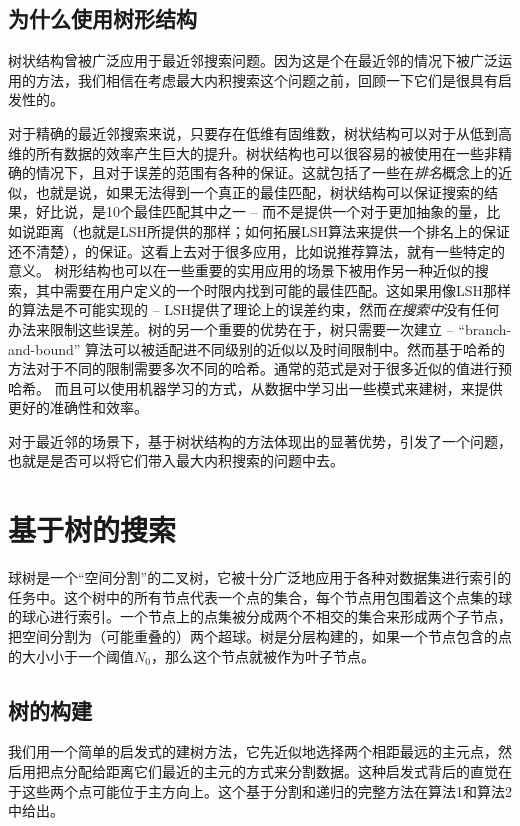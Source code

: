 \documentclass[twocolumn]{article}
\begin{document}
\subsection{为什么使用树形结构}

树状结构曾被广泛应用于最近邻搜索问题。因为这是个在最近邻的情况下被广泛运用的方法，我们相信在考虑最大内积搜索这个问题之前，回顾一下它们是很具有启发性的。

对于精确的最近邻搜索来说，只要存在低维有固维数，树状结构可以对于从低到高维的所有数据的效率产生巨大的提升。树状结构也可以很容易的被使用在一些非精确的情况下，且对于误差的范围有各种的保证。这就包括了一些在\emph{排名}概念上的近似，也就是说，如果无法得到一个真正的最佳匹配，树状结构可以保证搜索的结果，好比说，是10个最佳匹配其中之一 -- 而不是提供一个对于更加抽象的量，比如说距离（也就是LSH所提供的那样；如何拓展LSH算法来提供一个排名上的保证还不清楚），的保证。这看上去对于很多应用，比如说推荐算法，就有一些特定的意义。
树形结构也可以在一些重要的实用应用的场景下被用作另一种近似的搜索，其中需要在用户定义的一个时限内找到可能的最佳匹配。这如果用像LSH那样的算法是不可能实现的 -- LSH提供了理论上的误差约束，然而\emph{在搜索中}没有任何办法来限制这些误差。树的另一个重要的优势在于，树只需要一次建立 -- “branch-and-bound” 算法可以被适配进不同级别的近似以及时间限制中。然而基于哈希的方法对于不同的限制需要多次不同的哈希。通常的范式是对于很多近似的值进行预哈希。
而且可以使用机器学习的方式，从数据中学习出一些模式来建树，来提供更好的准确性和效率。

对于最近邻的场景下，基于树状结构的方法体现出的显著优势，引发了一个问题，也就是是否可以将它们带入最大内积搜索的问题中去。

\section{基于树的搜索}

球树是一个“空间分割”的二叉树，它被十分广泛地应用于各种对数据集进行索引的任务中。这个树中的所有节点代表一个点的集合，每个节点用包围着这个点集的球的球心进行索引。一个节点上的点集被分成两个不相交的集合来形成两个子节点，把空间分割为（可能重叠的）两个超球。树是分层构建的，如果一个节点包含的点的大小小于一个阈值$N_0$，那么这个节点就被作为叶子节点。

\subsection{树的构建}

我们用一个简单的启发式的建树方法，它先近似地选择两个相距最远的主元点，然后用把点分配给距离它们最近的主元的方式来分割数据。这种启发式背后的直觉在于这些两个点可能位于主方向上。这个基于分割和递归的完整方法在算法1和算法2中给出。
\end{document}
